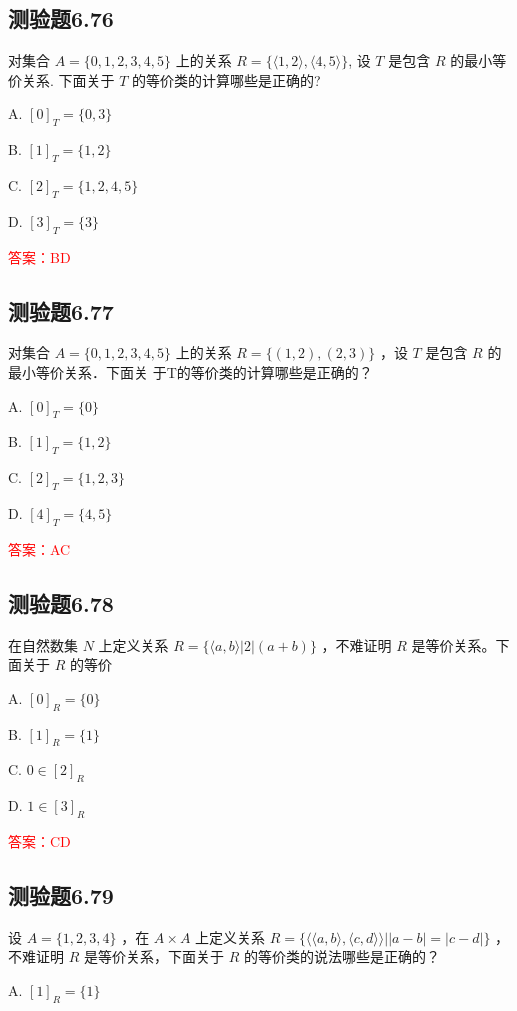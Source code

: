 \documentclass[UTF8, heading=true]{ctexart}
\begin{document}
\subsection{测验题6.76}

对集合 $A=\{0,1,2,3,4,5\}$ 上的关系 $R=\{\langle 1,2\rangle,\langle 4,5\rangle \}$, 设 $T$ 是包含 $R$ 的最小等价关系. 下面关于 $T$ 的等价类的计算哪些是正确的?

A. $[0]_T=\{0,3\}$

B. $[1]_T=\{1,2\}$

C. $[2]_T=\{1,2,4,5\}$

D. $[3]_T=\{3\}$

\textcolor{red}{答案：BD}

\subsection{测验题6.77}

对集合 $A=\{0,1,2,3,4,5\}$ 上的关系 $R=\{(1,2),(2,3)\}$ ，设 $T$ 是包含 $R$ 的最小等价关系．下面关
于T的等价类的计算哪些是正确的？

A. $[0]_T=\{0\}$

B. $[1]_T=\{1,2\}$


C. $[2]_T=\{1,2,3\}$

D. $[4]_T=\{4,5\}$


\textcolor{red}{答案：AC}

\subsection{测验题6.78}

在自然数集 $N$ 上定义关系 $R=\{\langle a, b\rangle|2|(a+b)\}$ ，不难证明 $R$ 是等价关系。下面关于 $R$ 的等价

A. $[0]_R=\{0\}$

B. $[1]_R=\{1\}$

C. $0 \in[2]_R$

D. $1 \in[3]_R$

\textcolor{red}{答案：CD}

\subsection{测验题6.79}

设 $A=\{1,2,3,4\}$ ，在 $A \times A$ 上定义关系 $R=\{\langle\langle a, b\rangle,\langle c, d\rangle\rangle| | a-b|=|c-d|\}$ ，不难证明 $R$ 是等价关系，下面关于 $R$ 的等价类的说法哪些是正确的？

A. $[1]_R=\{1\}$
\end{document}
